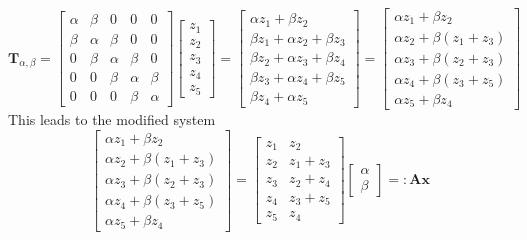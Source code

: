 \documentclass{article}
\begin{document}
\begin{equation*}  \mathbf{T}_{\alpha,\beta} = \begin{bmatrix}
    \alpha & \beta & 0 & 0 & 0 \\
    \beta & \alpha & \beta & 0 & 0 \\
    0 & \beta & \alpha & \beta & 0 \\
    0 & 0 & \beta & \alpha & \beta \\
    0 & 0 & 0 & \beta & \alpha
    \end{bmatrix}
    \begin{bmatrix}
        z_{1} \\
        z_{2} \\
        z_{3} \\
        z_{4} \\
        z_{5}
    \end{bmatrix}
    = 
    \begin{bmatrix}
        \alpha z_{1} + \beta z_{2} \\
        \beta z_{1} + \alpha z_{2} + \beta z_{3} \\
        \beta z_{2} + \alpha z_{3} + \beta z_{4} \\
        \beta z_{3} + \alpha z_{4} + \beta z_{5} \\
        \beta z_{4} + \alpha z_{5}
    \end{bmatrix} = 
    \begin{bmatrix}
        \alpha z_{1} + \beta z_{2} \\
        \alpha z_{2} + \beta \left(z_{1} +z_{3}\right) \\
        \alpha z_{3} + \beta\left(z_{2} + z_{3}\right) \\
        \alpha z_{4} + \beta \left(z_{3} + z_{5}\right) \\
        \alpha z_{5} +\beta z_{4}
    \end{bmatrix}
\end{equation*}
This leads to the modified system
\begin{equation*}
   \begin{bmatrix}
        \alpha z_{1} + \beta z_{2} \\
        \alpha z_{2} + \beta \left(z_{1} +z_{3}\right) \\
        \alpha z_{3} + \beta\left(z_{2} + z_{3}\right) \\
        \alpha z_{4} + \beta \left(z_{3} + z_{5}\right) \\
        \alpha z_{5} +\beta z_{4}
    \end{bmatrix} = 
    \begin{bmatrix}
        z_{1} & z_{2} \\
        z_{2} & z_{1} +z_{3} \\
        z_{3} & z_{2} + z_{4} \\
        z_{4} & z_{3} + z_{5} \\
        z_{5} & z_{4}
    \end{bmatrix}
     \begin{bmatrix}
         \alpha \\
         \beta
     \end{bmatrix}=: \mathbf{A}\mathbf{x}
\end{equation*}
\end{document}
